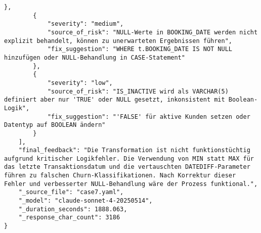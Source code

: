 \begin{lstlisting}[caption={Ausgabe: Claude Sonnet 4 Anwendungsfall 7 Konsistenzdurchlauf},label={claude_case7_prompt2}]
        },
        {
            "severity": "medium",
            "source_of_risk": "NULL-Werte in BOOKING_DATE werden nicht explizit behandelt, können zu unerwarteten Ergebnissen führen",
            "fix_suggestion": "WHERE t.BOOKING_DATE IS NOT NULL hinzufügen oder NULL-Behandlung in CASE-Statement"
        },
        {
            "severity": "low",
            "source_of_risk": "IS_INACTIVE wird als VARCHAR(5) definiert aber nur 'TRUE' oder NULL gesetzt, inkonsistent mit Boolean-Logik",
            "fix_suggestion": "'FALSE' für aktive Kunden setzen oder Datentyp auf BOOLEAN ändern"
        }
    ],
    "final_feedback": "Die Transformation ist nicht funktionstüchtig aufgrund kritischer Logikfehler. Die Verwendung von MIN statt MAX für das letzte Transaktionsdatum und die vertauschten DATEDIFF-Parameter führen zu falschen Churn-Klassifikationen. Nach Korrektur dieser Fehler und verbesserter NULL-Behandlung wäre der Prozess funktional.",
    "_source_file": "case7.yaml",
    "_model": "claude-sonnet-4-20250514",
    "_duration_seconds": 1888.063,
    "_response_char_count": 3186
}
\end{lstlisting}

